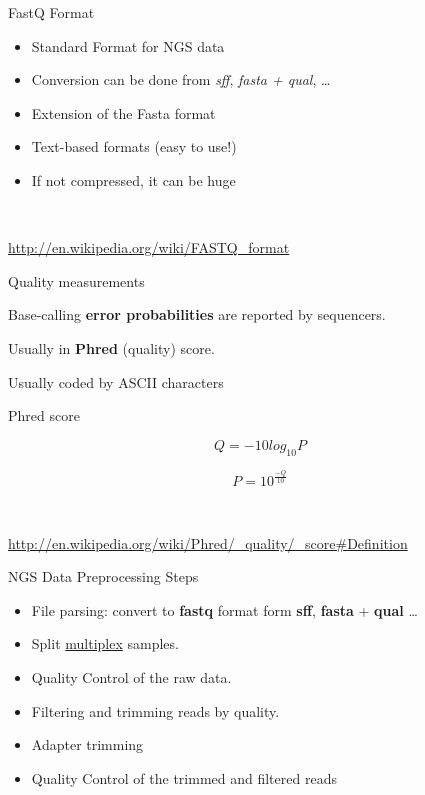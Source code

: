 \begin{frame}{FastQ Format}

\begin{itemize}
\itemsep1pt\parskip0pt
\item
  Standard Format for NGS data
\item
  Conversion can be done from \emph{sff}, \emph{fasta + qual}, \ldots{}
\item
  Extension of the Fasta format
\item
  Text-based formats (easy to use!)
\item
  If not compressed, it can be huge
\end{itemize}

~

\url{http://en.wikipedia.org/wiki/FASTQ_format}

\end{frame}

\begin{frame}{Quality measurements}

Base-calling \textbf{error probabilities} are reported by sequencers.

Usually in \textbf{Phred} (quality) score.

Usually coded by ASCII characters

\begin{block}{Phred score}

\[Q = -10 log_{10} P\]

\[P = 10^{\frac{-Q}{10}}\]

~

\url{http://en.wikipedia.org/wiki/Phred/_quality/_score\#Definition}

\end{block}

\end{frame}

\begin{frame}{NGS Data Preprocessing Steps}

\begin{itemize}
\item
  File parsing: convert to \textbf{fastq} format form \textbf{sff},
  \textbf{fasta} + \textbf{qual} \ldots{}
\item
  Split
  \href{http://www.illumina.com/technology/multiplexing_sequencing_assay.ilmn}{multiplex}
  samples.
\item
  Quality Control of the raw data.
\item
  Filtering and trimming reads by quality.
\item
  Adapter trimming
\item
  Quality Control of the trimmed and filtered reads
\end{itemize}

\end{frame}

